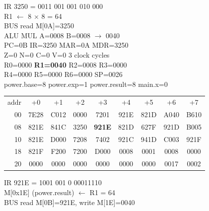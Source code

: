 \noindent\begin{tcolorbox}[stepbox, title={Step 26 \hfill PC 0A \quad MUL R1, R1, R2}]
\textcolor{dim}{IR} 3250 = 0011 001 001 010 000\\
R1 $\leftarrow$ 8 $\times$ 8 = 64\\
\textcolor{dim}{BUS} read M[0A]=3250\\
\textcolor{dim}{ALU} MUL A=0008 B=0008 $\rightarrow$ 0040\\
PC=0B IR=3250 MAR=0A MDR=3250\\
Z=0 N=0 C=0 V=0 \hfill \textcolor{dim}{3 clock cycles}\\
R0=0000 \textcolor{wrt}{\textbf{R1=0040}} R2=0008 R3=0000\\
R4=0000 R5=0000 R6=0000 SP=0026\\
\textcolor{dim}{power.base=8  power.exp=1  power.result=8  main.x=0}\\[1pt]
{\setlength{\tabcolsep}{1.6pt}\begin{tabular}{@{}r*{8}{c}@{}}
\textcolor{dim}{addr} & \textcolor{dim}{+0} & \textcolor{dim}{+1} & \textcolor{dim}{+2} & \textcolor{dim}{+3} & \textcolor{dim}{+4} & \textcolor{dim}{+5} & \textcolor{dim}{+6} & \textcolor{dim}{+7}\\
\textcolor{dim}{00} & 7E28 & C012 & 0000 & 7201 & 921E & 821D & A040 & B610\\
\textcolor{dim}{08} & 821E & 841C & 3250 & \cellcolor{pcc}\textbf{921E} & 821D & 627F & 921D & B005\\
\textcolor{dim}{10} & 821E & D000 & 7208 & 7402 & 921C & 941D & C003 & 921F\\
\textcolor{dim}{18} & 821F & F200 & 7200 & D000 & \cellcolor{datac}0008 & \cellcolor{datac}0001 & \cellcolor{datac}0008 & \cellcolor{datac}0000\\
\textcolor{dim}{20} & \cellcolor{stackc}0000 & \cellcolor{stackc}0000 & \cellcolor{stackc}0000 & \cellcolor{stackc}0000 & \cellcolor{stackc}0000 & \cellcolor{stackc}0000 & \cellcolor{stackc}0017 & \cellcolor{stackc}0002\\
\end{tabular}}
\end{tcolorbox}\hfill\begin{tcolorbox}[stepbox, title={Step 27 \hfill PC 0B \quad ST R1, power.result}]
\textcolor{dim}{IR} 921E = 1001 001 0 00011110\\
M[0x1E] (power.result) $\leftarrow$ R1 = 64\\
\textcolor{dim}{BUS} read M[0B]=921E, \textcolor{wrt}{write M[1E]=0040}\\

\end{tcolorbox}
